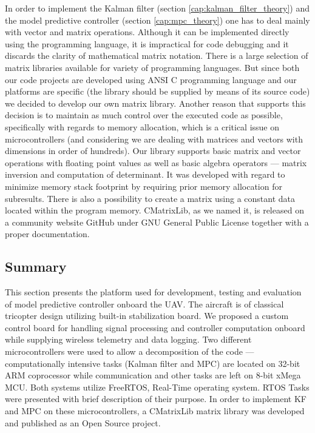 In order to implement the Kalman filter (section \ref{cap:kalman_filter_theory}) and the model predictive controller (section \ref{cap:mpc_theory}) one has to deal mainly with vector and matrix operations. Although it can be implemented directly using the programming language, it is impractical for code debugging and it discards the clarity of mathematical matrix notation. There is a large selection of matrix libraries \citep{matrixlibraries} available for variety of programming languages. But since both our code projects are developed using ANSI C programming language and our platforms are specific (the library should be supplied by means of its source code) we decided to develop our own matrix library. Another reason that supports this decision is to maintain as much control over the executed code as possible, specifically with regards to memory allocation, which is a critical issue on microcontrollers (and considering we are dealing with matrices and vectors with dimensions in order of hundreds). Our library supports basic matrix and vector operations with floating point values as well as basic algebra operators --- matrix inversion and computation of determinant. It was developed with regard to minimize memory stack footprint by requiring prior memory allocation for subresults. There is also a possibility to create a matrix using a constant data located within the program memory. CMatrixLib, as we named it, is released on a community website GitHub \citep{cmatrixlib} under GNU General Public License together with a proper documentation.

\subsection{Summary}

This section presents the platform used for development, testing and evaluation of model predictive controller onboard the UAV. The aircraft is of classical tricopter design utilizing built-in stabilization board. We proposed a custom control board for handling signal processing and controller computation onboard while supplying wireless telemetry and data logging. Two different microcontrollers were used to allow a decomposition of the code --- computationally intensive tasks (Kalman filter and MPC) are located on 32-bit ARM coprocessor while communication and other tasks are left on 8-bit xMega MCU. Both systems utilize FreeRTOS, Real-Time operating system. RTOS Tasks were presented with brief description of their purpose. In order to implement KF and MPC on these microcontrollers, a CMatrixLib matrix library was developed and published as an Open Source project. 